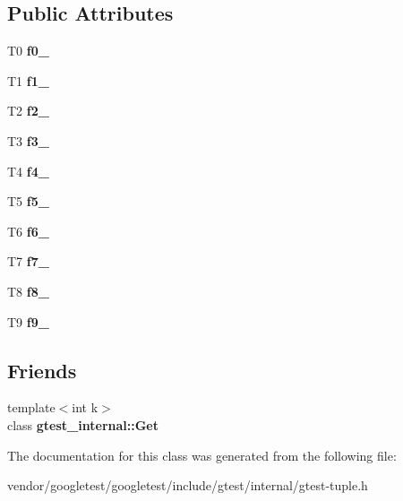 \subsection*{Public Attributes}
\begin{DoxyCompactItemize}
\item 
\mbox{\label{classstd_1_1tr1_1_1tuple_a771b1d99e8800fb284acd04bca838cbb}} 
T0 {\bfseries f0\+\_\+}
\item 
\mbox{\label{classstd_1_1tr1_1_1tuple_a7cccf899dedc626c51fa4f6921d0ac52}} 
T1 {\bfseries f1\+\_\+}
\item 
\mbox{\label{classstd_1_1tr1_1_1tuple_aaec06c27366502dc332ef96878628f84}} 
T2 {\bfseries f2\+\_\+}
\item 
\mbox{\label{classstd_1_1tr1_1_1tuple_ad4d3673e0d5c07c392c02e335fe978ff}} 
T3 {\bfseries f3\+\_\+}
\item 
\mbox{\label{classstd_1_1tr1_1_1tuple_ab662f1051c2302d065796383848db6c4}} 
T4 {\bfseries f4\+\_\+}
\item 
\mbox{\label{classstd_1_1tr1_1_1tuple_a32d8cd6f180c0a77d83733fc65423657}} 
T5 {\bfseries f5\+\_\+}
\item 
\mbox{\label{classstd_1_1tr1_1_1tuple_a597beab3af3f95c84408491ab14632b0}} 
T6 {\bfseries f6\+\_\+}
\item 
\mbox{\label{classstd_1_1tr1_1_1tuple_a7c28780e616d382833e844f62672c6bc}} 
T7 {\bfseries f7\+\_\+}
\item 
\mbox{\label{classstd_1_1tr1_1_1tuple_ae859012c83943e54e035a4a32089ccb6}} 
T8 {\bfseries f8\+\_\+}
\item 
\mbox{\label{classstd_1_1tr1_1_1tuple_a336d5e582fd34e45ec88c78d473671dd}} 
T9 {\bfseries f9\+\_\+}
\end{DoxyCompactItemize}
\subsection*{Friends}
\begin{DoxyCompactItemize}
\item 
\mbox{\label{classstd_1_1tr1_1_1tuple_aeeed38755abdaa78587dd1eac9ccc950}} 
{\footnotesize template$<$int k$>$ }\\class {\bfseries gtest\+\_\+internal\+::\+Get}
\end{DoxyCompactItemize}


The documentation for this class was generated from the following file\+:\begin{DoxyCompactItemize}
\item 
vendor/googletest/googletest/include/gtest/internal/gtest-\/tuple.\+h\end{DoxyCompactItemize}
